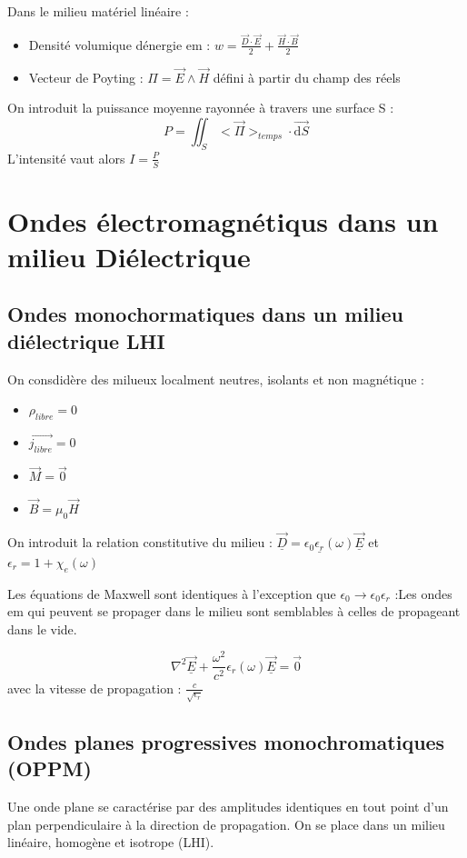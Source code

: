 \documentclass[french]{yLectureNote}
\renewcommand{\vec}{\overrightarrow}
\newcommand{\dd}{\mathrm{d}}
\newcommand{\lap}{\nabla^2}
\begin{document}
Dans le milieu matériel linéaire :
\begin{itemize}
    \item Densité volumique dénergie em : $w = \frac{\vec{D}\cdot \vec{E}}{2}+\frac{\vec{H}\cdot \vec{B}}{2}$
    \item Vecteur de Poyting : $\Pi = \vec{E}\wedge \vec{H}$ défini à partir du champ des réels 
\end{itemize}
On introduit la puissance moyenne rayonnée à travers une surface S :
$$P = \iint_S <\vec{\Pi}>_{temps}\cdot \vec{\dd S}$$
L'intensité vaut alors $ I = \frac{P}{S}$
\section{Ondes électromagnétiqus dans un milieu Diélectrique}
\subsection{Ondes monochormatiques dans un milieu diélectrique LHI}
On consdidère des milueux localment neutres, isolants et non magnétique :
\begin{itemize}
    \item $\rho_{libre} =0$
    \item $\vec{j_{libre}} = 0$
    \item $\vec{M} = \vec{0}$
    \item $\vec{B} = \mu_0\vec{H}$
\end{itemize}
On introduit la relation constitutive du milieu : $\vec{\underline{D}} = \epsilon_0\underline{\epsilon_r}(\omega)\vec{\underline{E}}$ et $\epsilon_r = 1+ \chi_e(\omega)$

Les équations de Maxwell sont identiques à l'exception que $\epsilon_0\to \epsilon_0\epsilon_r$ :Les ondes em qui peuvent se propager dans le milieu sont semblables à celles de propageant dans le vide.

$$\lap \vec{\underline{E}}+\frac{\omega^2}{c^2}\epsilon_r(\omega)\vec{\underline{E}}=\vec{0}$$
avec la vitesse de propagation : $\frac{c}{\sqrt{\epsilon_r}}$

\subsection{Ondes planes progressives monochromatiques (OPPM)}

Une onde plane se caractérise par des amplitudes identiques en tout point d'un plan perpendiculaire à la direction de propagation. On se place dans un milieu linéaire, homogène et isotrope (LHI).
\end{document}

